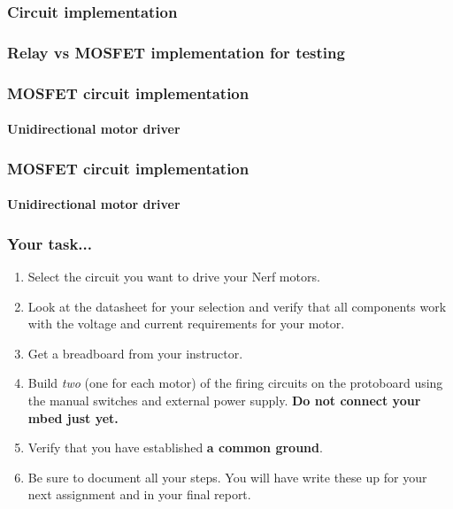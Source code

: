 \documentclass[aspectratio=169]{beamer}
\begin{document}
\begin{frame}
\frametitle{Circuit implementation}
\end{frame}

\begin{frame}
\frametitle{Relay vs {MOSFET} implementation for testing}
\end{frame}

\begin{frame}
\frametitle{{MOSFET} circuit implementation}
\framesubtitle{Unidirectional motor driver}
\end{frame}

\begin{frame}
\frametitle{{MOSFET} circuit implementation}
\framesubtitle{Unidirectional motor driver}
\end{frame}

\begin{frame}
\frametitle{Your task...}
\begin{enumerate}
\item Select the circuit you want to drive your Nerf motors.
\item Look at the datasheet for your selection and verify that all components work with the voltage and current requirements for your motor.
\item Get a breadboard from your instructor.
\item Build \emph{two} (one for each motor) of the firing circuits on the protoboard using the manual switches and external power supply. \textbf{Do not connect your mbed just yet.}
\item Verify that you have established \textbf{a common ground}.
\item Be sure to document all your steps.  You will have write these up for your next assignment and in your final report.
\end{enumerate}
\end{frame}
\end{document}
